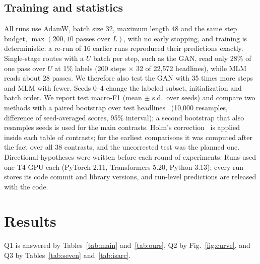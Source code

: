 \documentclass[conference]{IEEEtran}
\begin{document}
\subsection{Training and statistics}
All runs use AdamW, batch size 32, maximum length 48 and the same step budget, $\max(200, 10 \text{ passes over } L)$, with no early stopping, and training is deterministic: a re-run of 16 earlier runs reproduced their predictions exactly. Single-stage routes with a $U$ batch per step, such as the GAN, read only 28\% of one pass over $U$ at 1\% labels (200 steps $\times$ 32 of 22,572 headlines), while MLM reads about 28 passes. We therefore also test the GAN with 35 times more steps and MLM with fewer. Seeds 0--4 change the labeled subset, initialization and batch order. We report test macro-F1 (mean $\pm$ s.d.\ over seeds) and compare two methods with a paired bootstrap over test headlines~\cite{berg2012empirical} (10,000 resamples, difference of seed-averaged scores, 95\% interval); a second bootstrap that also resamples seeds is used for the main contrasts. Holm's correction~\cite{holm1979simple} is applied inside each table of contrasts; for the earliest comparisons it was computed after the fact over all 38 contrasts, and the uncorrected test was the planned one. Directional hypotheses were written before each round of experiments. Runs used one T4 GPU each (PyTorch 2.11, Transformers 5.20, Python 3.13); every run stores its code commit and library versions, and run-level predictions are released with the code.

\section{Results}
Q1 is answered by Tables~\ref{tab:main} and~\ref{tab:ours}, Q2 by Fig.~\ref{fig:curve}, and Q3 by Tables~\ref{tab:seven} and~\ref{tab:isarc}.
\end{document}
